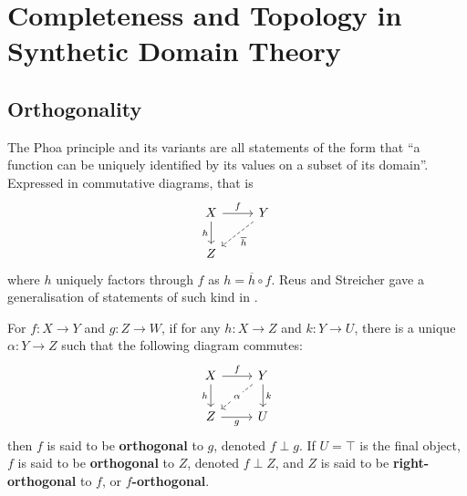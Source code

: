 
\chapter{Completeness and Topology in Synthetic Domain Theory}
\label{chapter-topology}


\section{Orthogonality}
The Phoa principle and its variants are all statements of the form that ``a function can be uniquely identified by its values on a subset of its domain''. Expressed in commutative diagrams, that is
\[\begin{tikzcd}
    X & Y \\
    Z
    \arrow["f", from=1-1, to=1-2]
    \arrow["h"', from=1-1, to=2-1]
    \arrow["{\overline{h}}", dashed, from=1-2, to=2-1]
\end{tikzcd}\]
where $h$ uniquely factors through $f$ as $h=\overline{h}\circ f$.
Reus and Streicher gave a generalisation of statements of such kind in \cite{reus_general_1997}.
\begin{definition}
    For $f:X\to Y$ and $g:Z\to W$, if for any $h:X\to Z$ and $k:Y\to U$, there is a unique $\alpha:Y\to Z$ such that the following diagram commutes:
    \[\begin{tikzcd}
        X & Y \\
        Z & U
        \arrow["f", from=1-1, to=1-2]
        \arrow["h"', from=1-1, to=2-1]
        \arrow["\alpha"{description}, dashed, from=1-2, to=2-1]
        \arrow["k", from=1-2, to=2-2]
        \arrow["g"', from=2-1, to=2-2]
    \end{tikzcd}\]
    then $f$ is said to be \textbf{orthogonal} to $g$, denoted $f\perp g$. If $U=\top$ is the final object, $f$ is said to be \textbf{orthogonal} to $Z$, denoted $f\perp Z$, and $Z$ is said to be \textbf{right-orthogonal} to $f$, or \textbf{$f$-orthogonal}.
\end{definition}

